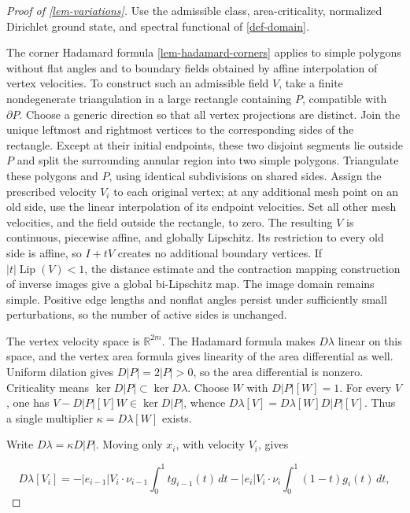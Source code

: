 \documentclass[11pt,a4paper]{article}
\theoremstyle{proofmanuscript}
\begin{document}
\begin{proof}[Proof of \ref{lem-variations}]

Use the admissible class, area-criticality, normalized Dirichlet ground state, and spectral functional of \ref{def-domain}.

The corner Hadamard formula \ref{lem-hadamard-corners} applies to simple polygons without flat angles and to boundary fields obtained by affine interpolation of vertex velocities. To construct such an admissible field \(V\), take a finite nondegenerate triangulation in a large rectangle containing \(P\), compatible with \(\partial P\). Choose a generic direction so that all vertex projections are distinct. Join the unique leftmost and rightmost vertices to the corresponding sides of the rectangle. Except at their initial endpoints, these two disjoint segments lie outside \(P\) and split the surrounding annular region into two simple polygons. Triangulate these polygons and \(P\), using identical subdivisions on shared sides. Assign the prescribed velocity \(V_i\) to each original vertex; at any additional mesh point on an old side, use the linear interpolation of its endpoint velocities. Set all other mesh velocities, and the field outside the rectangle, to zero. The resulting \(V\) is continuous, piecewise affine, and globally Lipschitz. Its restriction to every old side is affine, so \(I+tV\) creates no additional boundary vertices. If \(|t|\operatorname{Lip}(V)<1\), the distance estimate and the contraction mapping construction of inverse images give a global bi-Lipschitz map. The image domain remains simple. Positive edge lengths and nonflat angles persist under sufficiently small perturbations, so the number of active sides is unchanged.

The vertex velocity space is \(\mathbb R^{2m}\). The Hadamard formula makes \(D\lambda\) linear on this space, and the vertex area formula gives linearity of the area differential as well. Uniform dilation gives \(D|P|=2|P|>0\), so the area differential is nonzero. Criticality means \(\ker D|P|\subset\ker D\lambda\). Choose \(W\) with \(D|P|[W]=1\). For every \(V\), one has \(V-D|P|[V]W\in\ker D|P|\), whence \(D\lambda[V]=D\lambda[W]D|P|[V]\). Thus a single multiplier \(\kappa=D\lambda[W]\) exists.

Write \(D\lambda=\kappa D|P|\). Moving only \(x_i\), with velocity \(V_i\), gives

\[
D\lambda[V_i]=-|e_{i-1}|V_i\cdot\nu_{i-1}
\int_0^1t g_{i-1}(t)\,dt
-|e_i|V_i\cdot\nu_i\int_0^1(1-t)g_i(t)\,dt,
\]


\end{proof}
\end{document}
